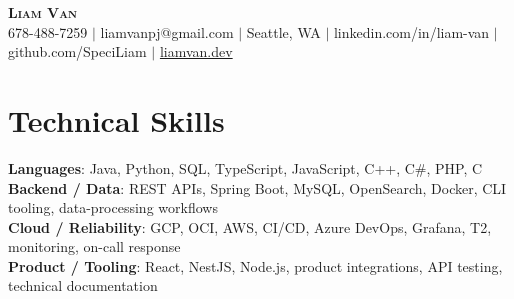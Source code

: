 \documentclass[letterpaper,11pt]{article}
\begin{document}

%
\begin{center}
    \textbf{\Huge \scshape Liam Van} \\ \vspace{1pt}
    \small 678-488-7259 $|$ \small {liamvanpj@gmail.com} $|$ Seattle, WA
 {{$|$ linkedin.com/in/liam-van} {$|$ github.com/SpeciLiam} {$|$ \href{https://liamvan.dev}{liamvan.dev}}}

\end{center}

\section{Technical Skills}
 \begin{itemize}[leftmargin=0.15in, label={}]
    \small{\item{
     \textbf{Languages}{: Java, Python, SQL, TypeScript, JavaScript, C++, C\#, PHP, C} \\
     \textbf{Backend / Data}{: REST APIs, Spring Boot, MySQL, OpenSearch, Docker, CLI tooling, data-processing workflows} \\
     \textbf{Cloud / Reliability}{: GCP, OCI, AWS, CI/CD, Azure DevOps, Grafana, T2, monitoring, on-call response} \\
     \textbf{Product / Tooling}{: React, NestJS, Node.js, product integrations, API testing, technical documentation} \\
    }}
 \end{itemize}
%

\end{document}
